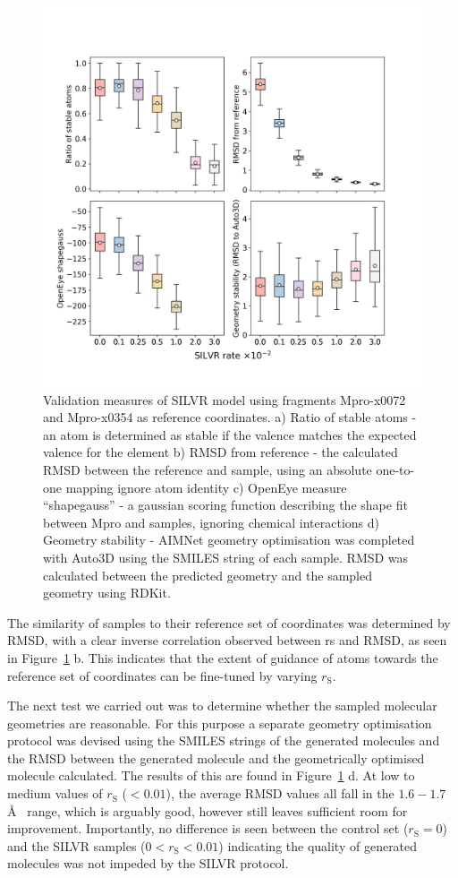 \documentclass[journal=jacsat,manuscript=article]{achemso}
\begin{document}
\begin{figure}[h!]
    \centering
    \includegraphics[width=\textwidth]{paper/Figures/Fig3/fig_3_metrics.png}
    \caption{Validation measures of SILVR model using fragments Mpro-x0072 and Mpro-x0354 as reference coordinates. a) Ratio of stable atoms - an atom is determined as stable if the valence matches the expected valence for the element b) RMSD from reference - the calculated RMSD between the reference and sample, using an absolute one-to-one mapping ignore atom identity c) OpenEye measure “shapegauss” - a gaussian scoring function describing the shape fit between Mpro and samples, ignoring chemical interactions d) Geometry stability - AIMNet geometry optimisation was completed with Auto3D using the SMILES string of each sample. RMSD was calculated between the predicted geometry and the sampled geometry using RDKit.}
    \label{fig:measures}
\end{figure}
The similarity of samples to their reference set of coordinates was determined by RMSD, with a clear inverse correlation observed between rs and RMSD, as seen in Figure~\ref{fig:measures} b. This indicates that the extent of guidance of atoms towards the reference set of coordinates can be fine-tuned by varying $r_{\mathrm{S}}$. 

The next test we carried out was to determine whether the sampled molecular geometries are reasonable. For this purpose a separate geometry optimisation protocol was devised using the SMILES strings of the generated molecules and the RMSD between the generated molecule and the geometrically optimised molecule calculated. The results of this are found in Figure~\ref{fig:measures} d. At low to medium values of $r_{\mathrm{S}}$ ($< 0.01$), the average RMSD values all fall in the $1.6 - 1.7$ \AA~  range, which is arguably good, however still leaves sufficient room for improvement. Importantly, no difference is seen between the control set ($r_{\mathrm{S}}=0$) and the SILVR samples ($0 < r_{\mathrm{S}} < 0.01$) indicating the quality of generated molecules was not impeded by the SILVR protocol. 
\end{document}
